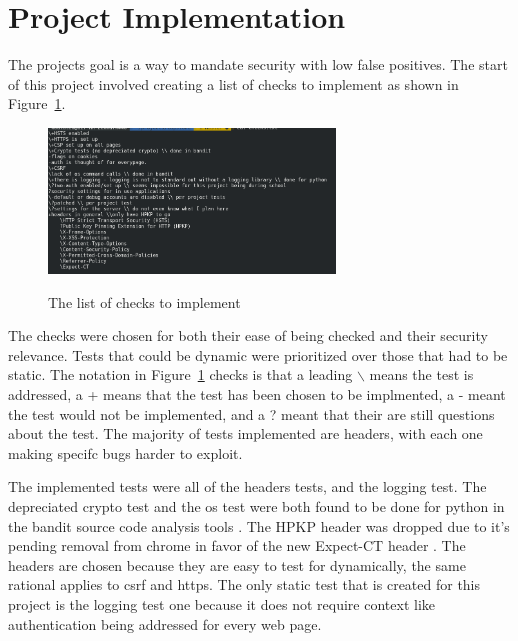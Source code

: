 \section{Project Implementation}
The projects goal is a way to mandate security with low false positives. The start of this project involved creating a list of checks to implement as shown in Figure~\ref{fig:fig1}.
\begin{figure}[!ht]
  \centering
\includegraphics[width=3in]{unittestchecks}
\caption{\label{fig:fig1}}The list of checks to implement
\end{figure}
The checks were chosen for both their ease of being checked and their security relevance. Tests that could be dynamic were prioritized over those that had to be static. The notation in 
Figure~\ref{fig:fig1} checks is that a leading $\backslash$ means the test is addressed, a + means that the test has been chosen to be implmented, a - meant the test would not be implemented, and a ?
meant that their are still questions about the test. The majority of tests implemented are headers, with each one making specifc bugs harder to exploit.

The implemented tests were all of the headers tests, and the logging test. The depreciated crypto test and the os test were both found to be done for python in the bandit source code analysis tools
\cite{bandit}. The HPKP header was dropped due to it's pending removal from chrome in favor of the new Expect-CT header \cite{hpkp}. The headers are chosen because they are easy to test for
dynamically, the same rational applies to csrf and https. The only static test that is created for this project is the logging test one because it does not require context like authentication being
addressed for every web page.

